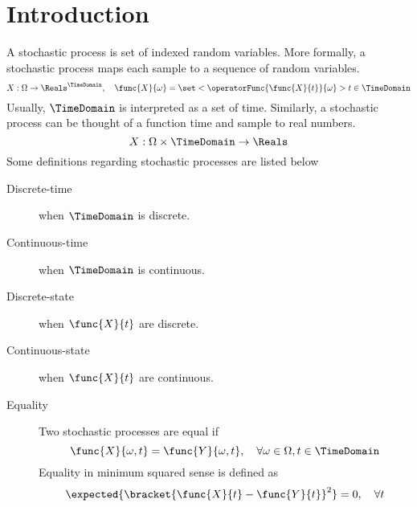 \chapter{Introduction}
A stochastic process is set of indexed random variables. More formally, a stochastic process maps each sample to a sequence of random variables. 
\begin{equation*}
    X : \Omega \to \Reals^{\TimeDomain}, \quad \func{X}{\omega} = \set<\operatorFunc{\func{X}{t}}{\omega}>{t \in \TimeDomain}
\end{equation*}
Usually, \(\TimeDomain\) is interpreted as a set of time. Similarly, a stochastic process can be thought of a function time and sample to real numbers.
\begin{equation*}
    X : \Omega \times \TimeDomain \to \Reals
\end{equation*}
Some definitions regarding stochastic processes are listed below
\begin{description}
    \item[Discrete-time] when \(\TimeDomain\) is discrete.
    \item[Continuous-time] when \(\TimeDomain\) is continuous.
    \item[Discrete-state] when \(\func{X}{t}\) are discrete.
    \item[Continuous-state] when \(\func{X}{t}\) are continuous.
    \item[Equality] Two stochastic processes are equal if 
    \begin{equation*}
        \func{X}{\omega,t} = \func{Y}{\omega,t}, \quad \forall \omega \in \Omega, t \in \TimeDomain
    \end{equation*} 
    Equality in minimum squared sense is defined as 
    \begin{equation*}
        \expected{\bracket{\func{X}{t} - \func{Y}{t}}^2} = 0, \quad \forall t
    \end{equation*}
\end{description}

